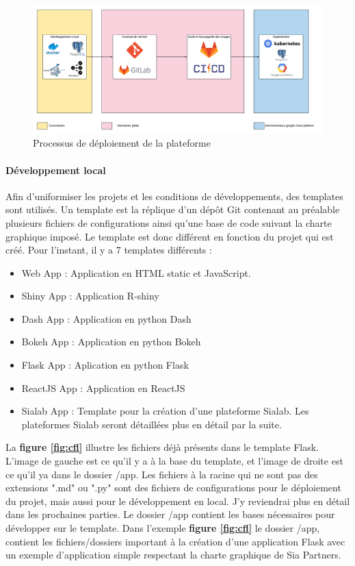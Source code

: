 \documentclass{article} %
\begin{document}
{\begin{figure}[!h]
 \centering
 \includegraphics[keepaspectratio = true,scale=0.4]{structure.png}
 \caption{Processus de déploiement de la plateforme}
 \label{fig:struct}
\end{figure}

\paragraph{Développement local\\}
Afin d'uniformiser les projets et les conditions de développements, des templates sont utilisés. Un template est la réplique d'un dépôt Git contenant au préalable plusieurs fichiers de configurations ainsi qu'une base de code suivant la charte graphique imposé. Le template est donc différent en fonction du projet qui est créé. Pour l'instant, il y a 7 templates différents :
\begin{itemize}
 \item Web App : Application en HTML static et JavaScript.
 \item Shiny App : Application R-shiny
 \item Dash App : Application en python Dash
 \item Bokeh App : Application en python Bokeh
 \item Flask App : Aplication en python Flask
 \item ReactJS App : Application en ReactJS
 \item Sialab App : Template pour la création d'une plateforme Sialab. Les plateformes Sialab seront détaillées plus en détail par la suite.
\end{itemize}

La \textbf{figure \ref{fig:cfl}} illustre les fichiers déjà présents dans le template Flask.  L'image de gauche est ce qu'il y a à la base du template, et l'image de droite est ce qu'il ya dans le dossier /app. Les fichiers à la racine qui ne sont pas des extensions ".md" ou ".py" sont des fichiers de configurations pour le déploiement du projet, mais aussi pour le développement en local. J'y reviendrai plus en détail dans les prochaines parties. Le dossier /app contient les bases nécessaires pour développer sur le template. Dans l'exemple \textbf{figure \ref{fig:cfl}} le dossier /app, contient les fichiers/dossiers important à la création d'une application Flask avec un exemple d'application simple respectant la charte graphique de Sia Partners.

}
\end{document}
